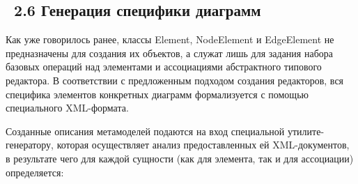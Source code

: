 \documentclass[a4paper]{article}
\begin{document}
\bigskip


\bigskip


\bigskip

\subsection[\ 2.6 Генерация специфики диаграмм]{\ 2.6 Генерация
специфики диаграмм}
{
Как уже говорилось ранее, классы \foreignlanguage{english}{Element},
\foreignlanguage{english}{NodeElement} и
\foreignlanguage{english}{EdgeElement} не предназначены для создания их
объектов, а служат лишь для задания набора базовых операций над
элементами и ассоциациями абстрактного типового редактора. В
соответствии с предложенным подходом создания редакторов, вся специфика
элементов конкретных диаграмм формализуется с помощью специального
\foreignlanguage{english}{XML}{}-формата. }

{
Созданные описания метамоделей подаются на вход специальной
утилите-генератору, которая осуществляет анализ предоставленных ей
\foreignlanguage{english}{XML}{}-документов, в результате чего для
каждой сущности (как для элемента, так и для ассоциации) определяется:}
\end{document}
